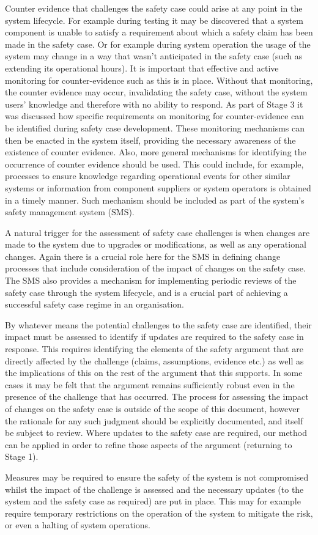 Counter evidence that challenges the safety case could arise at any point in the system lifecycle. For example during testing it may be discovered that a system component is unable to satisfy a requirement about which a safety claim has been made in the safety case. Or for example during system operation the usage of the system may change in a way that wasn't anticipated in the safety case (such as extending its operational hours). It is important that effective and active monitoring for counter-evidence such as this is in place. Without that monitoring, the counter evidence may occur, invalidating the safety case, without the system users' knowledge and therefore with no ability to respond. As part of Stage 3 it was discussed how specific requirements on monitoring for counter-evidence can be identified during safety case development. These monitoring mechanisms can then be enacted in the system itself, providing the necessary awareness of the existence of counter evidence. Also, more general mechanisms for identifying the occurrence of counter evidence should be used. This could include, for example, processes to ensure knowledge regarding operational events for other similar systems or information from component suppliers or system operators is obtained in a timely manner. Such mechanism should be included as part of the system's safety management system (SMS).

A natural trigger for the assessment of safety case challenges is when changes are made to the system due to upgrades or modifications, as well as any operational changes. Again there is a crucial role here for the SMS in defining change processes that include consideration of the impact of changes on the safety case. The SMS also provides a mechanism for implementing periodic reviews of the safety case through the system lifecycle, and is a crucial part of achieving a successful safety case regime in an organisation.

By whatever means the potential challenges to the safety case are identified, their impact must be assessed to identify if updates are required to the safety case in response. This requires identifying the elements of the safety argument that are directly affected by the challenge (claims, assumptions, evidence etc.) as well as the implications of this on the rest of the argument that this supports. In some cases it may be felt that the argument remains sufficiently robust even in the presence of the challenge that has occurred. The process for assessing the impact of changes on the safety case is outside of the scope of this document, however the rationale for any such judgment should be explicitly documented, and itself be subject to review. Where updates to the safety case are required, our method can be applied in order to refine those aspects of the argument (returning to Stage 1).

Measures may be required to ensure the safety of the system is not compromised whilst the impact of the challenge is assessed and the necessary updates (to the system and the safety case as required) are put in place. This may for example require temporary restrictions on the operation of the system to mitigate the risk, or even a halting of system operations. 
